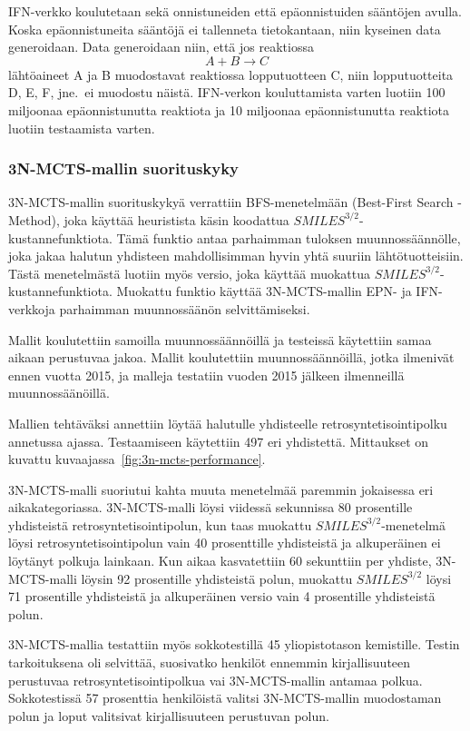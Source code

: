 \documentclass[finnish,twoside,censored,tkt,sw-line]{HYthesisML}
\begin{document}
IFN-verkko koulutetaan sekä onnistuneiden että epäonnistuiden sääntöjen avulla.
Koska epäonnistuneita sääntöjä ei tallenneta tietokantaan, niin kyseinen data generoidaan.
Data generoidaan niin, että jos reaktiossa \[A + B \rightarrow C\] lähtöaineet A ja B muodostavat reaktiossa lopputuotteen C, niin lopputuotteita D, E, F, jne.\ ei muodostu näistä.
IFN-verkon kouluttamista varten luotiin 100 miljoonaa epäonnistunutta reaktiota ja 10 miljoonaa epäonnistunutta reaktiota luotiin testaamista varten.

\subsubsection{3N-MCTS-mallin suorituskyky}

3N-MCTS-mallin suorituskykyä verrattiin BFS-menetelmään (Best-First Search -Method), joka käyttää heuristista käsin koodattua \(SMILES^{3/2}\)-kustannefunktiota.
Tämä funktio antaa parhaimman tuloksen muunnossäännölle, joka jakaa halutun yhdisteen mahdollisimman hyvin yhtä suuriin lähtötuotteisiin.
Tästä menetelmästä luotiin myös versio, joka käyttää muokattua \(SMILES^{3/2}\)-kustannefunktiota.
Muokattu funktio käyttää 3N-MCTS-mallin EPN- ja IFN-verkkoja parhaimman muunnossäänön selvittämiseksi.

Mallit koulutettiin samoilla muunnossäännöillä ja testeissä käytettiin samaa aikaan perustuvaa jakoa.
Mallit koulutettiin muunnossäännöillä, jotka ilmenivät ennen vuotta 2015, ja malleja testatiin vuoden 2015 jälkeen ilmenneillä muunnossäänöillä.

Mallien tehtäväksi annettiin löytää halutulle yhdisteelle retrosyntetisointipolku annetussa ajassa.
Testaamiseen käytettiin 497 eri yhdistettä.
Mittaukset on kuvattu kuvaajassa~\ref{fig:3n-mcts-performance}.

3N-MCTS-malli suoriutui kahta muuta menetelmää paremmin jokaisessa eri aikakategoriassa.
3N-MCTS-malli löysi viidessä sekunnissa 80 prosentille yhdisteistä retrosyntetisointipolun, kun taas muokattu \(SMILES^{3/2}\)-menetelmä löysi retrosyntetisointipolun vain 40 prosenttille yhdisteistä ja alkuperäinen ei löytänyt polkuja lainkaan.
Kun aikaa kasvatettiin 60 sekunttiin per yhdiste, 3N-MCTS-malli löysin 92 prosentille yhdisteistä polun, muokattu \(SMILES^{3/2}\) löysi 71 prosentille yhdisteistä ja alkuperäinen versio vain 4 prosentille yhdisteistä polun.

3N-MCTS-mallia testattiin myös sokkotestillä 45 yliopistotason kemistille.
Testin tarkoituksena oli selvittää, suosivatko henkilöt ennemmin kirjallisuuteen perustuvaa retrosyntetisointipolkua vai 3N-MCTS-mallin antamaa polkua.
Sokkotestissä 57 prosenttia henkilöistä valitsi 3N-MCTS-mallin muodostaman polun ja loput valitsivat kirjallisuuteen perustuvan polun.
\end{document}
